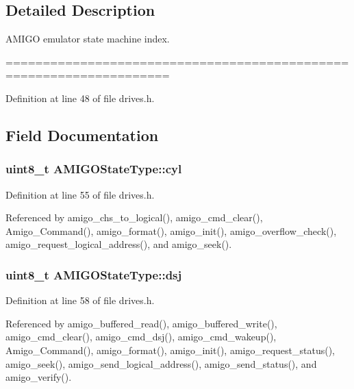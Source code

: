 \subsection{Detailed Description}
A\+M\+I\+GO emulator state machine index. 

==================================================================== 

Definition at line 48 of file drives.\+h.



\subsection{Field Documentation}
\subsubsection[{\texorpdfstring{cyl}{cyl}}]{\setlength{\rightskip}{0pt plus 5cm}uint8\+\_\+t A\+M\+I\+G\+O\+State\+Type\+::cyl}\hypertarget{structAMIGOStateType_a54b4a4f8221f9d38fb93f2d23a40e305}{}\label{structAMIGOStateType_a54b4a4f8221f9d38fb93f2d23a40e305}


Definition at line 55 of file drives.\+h.



Referenced by amigo\+\_\+chs\+\_\+to\+\_\+logical(), amigo\+\_\+cmd\+\_\+clear(), Amigo\+\_\+\+Command(), amigo\+\_\+format(), amigo\+\_\+init(), amigo\+\_\+overflow\+\_\+check(), amigo\+\_\+request\+\_\+logical\+\_\+address(), and amigo\+\_\+seek().

\subsubsection[{\texorpdfstring{dsj}{dsj}}]{\setlength{\rightskip}{0pt plus 5cm}uint8\+\_\+t A\+M\+I\+G\+O\+State\+Type\+::dsj}\hypertarget{structAMIGOStateType_ab2294deecb44cdb1675e4096dba22eb1}{}\label{structAMIGOStateType_ab2294deecb44cdb1675e4096dba22eb1}


Definition at line 58 of file drives.\+h.



Referenced by amigo\+\_\+buffered\+\_\+read(), amigo\+\_\+buffered\+\_\+write(), amigo\+\_\+cmd\+\_\+clear(), amigo\+\_\+cmd\+\_\+dsj(), amigo\+\_\+cmd\+\_\+wakeup(), Amigo\+\_\+\+Command(), amigo\+\_\+format(), amigo\+\_\+init(), amigo\+\_\+request\+\_\+status(), amigo\+\_\+seek(), amigo\+\_\+send\+\_\+logical\+\_\+address(), amigo\+\_\+send\+\_\+status(), and amigo\+\_\+verify().

